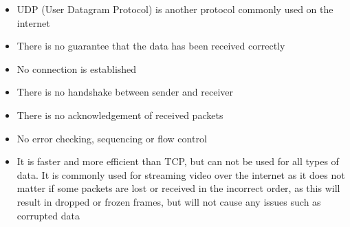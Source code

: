 \begin{itemize}
  \item UDP (User Datagram Protocol) is another protocol commonly used on the internet
  \item There is no guarantee that the data has been received correctly
  \item No connection is established
  \item There is no handshake between sender and receiver
  \item There is no acknowledgement of received packets
  \item No error checking, sequencing or flow control
  \item It is faster and more efficient than TCP, but can not be used for all types of data. It is commonly used for streaming video over the internet as it does not matter if some packets are lost or received in the incorrect order, as this will result in dropped or frozen frames, but will not cause any issues such as corrupted data
\end{itemize}